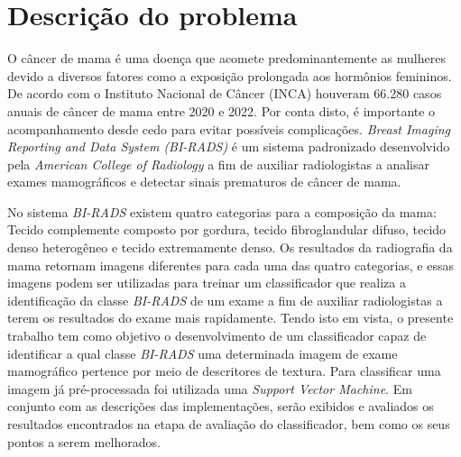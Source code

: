 \section{Descrição do problema}

O câncer de mama é uma doença que acomete predominantemente as mulheres 
devido a diversos fatores como a exposição prolongada aos hormônios femininos. 
De acordo com o Instituto Nacional de Câncer (INCA) houveram 66.280 casos anuais 
de câncer de mama entre 2020 e 2022. Por conta disto, é importante o acompanhamento 
desde cedo para evitar possíveis complicações. \emph{Breast Imaging Reporting and Data 
System (BI-RADS)} é um sistema padronizado desenvolvido pela \emph{American College of 
Radiology} a fim de auxiliar radiologistas a analisar exames mamográficos e detectar 
sinais prematuros de câncer de mama. 

No sistema \emph{BI-RADS} existem quatro categorias para a composição da mama: Tecido 
complemente composto por gordura, tecido fibroglandular difuso, tecido denso heterogêneo 
e tecido extremamente denso. Os resultados da radiografia da mama retornam imagens 
diferentes para cada uma das quatro categorias, e essas imagens podem ser utilizadas
para treinar um classificador que realiza a identificação da classe \emph{BI-RADS} de um exame 
a fim de auxiliar radiologistas a terem os resultados do exame mais rapidamente. 
Tendo isto em vista, o presente trabalho tem como objetivo o desenvolvimento de um 
classificador capaz de identificar a qual classe \emph{BI-RADS} uma determinada imagem de 
exame mamográfico pertence por meio de descritores de textura. Para classificar uma 
imagem já pré-processada foi utilizada uma \emph{Support Vector Machine}. Em conjunto com 
as descrições das implementações, serão exibidos e avaliados os resultados encontrados 
na etapa de avaliação do classificador, bem como os seus pontos a serem melhorados.

